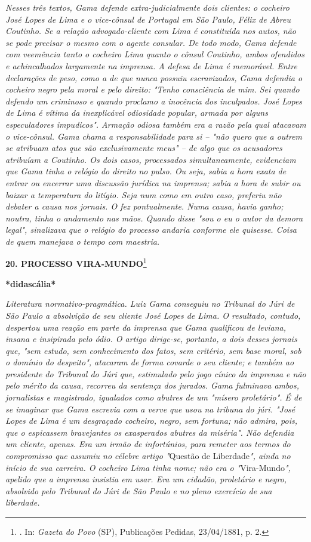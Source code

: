 \emph{Nesses três textos, Gama defende extra-judicialmente dois
clientes: o cocheiro José Lopes de Lima e o vice-cônsul de Portugal em
São Paulo, Félix de Abreu Coutinho. Se a relação advogado-cliente com
Lima é constituída nos autos, não se pode precisar o mesmo com o agente
consular. De todo modo, Gama defende com veemência tanto o cocheiro Lima
quanto o cônsul Coutinho, ambos ofendidos e achincalhados largamente na
imprensa. A defesa de Lima é memorável. Entre declarações de peso, como
a de que nunca possuiu escravizados, Gama defendia o cocheiro negro pela
moral e pelo direito: "Tenho consciência de mim. Sei quando defendo um
criminoso e quando proclamo a inocência dos inculpados. José Lopes de
Lima é vítima da inexplicável odiosidade popular, armada por alguns
especuladores impudicos". Armação odiosa também era a razão pela qual
atacavam o vice-cônsul. Gama chama a responsabilidade para si -- "não
quero que a outrem se atribuam atos que são exclusivamente meus" -- de
algo que os acusadores atribuíam a Coutinho. Os dois casos, processados
simultaneamente, evidenciam que Gama tinha o relógio do direito no
pulso. Ou seja, sabia a hora exata de entrar ou encerrar uma discussão
jurídica na imprensa; sabia a hora de subir ou baixar a temperatura do
litígio. Seja num como em outro caso, preferiu não debater a causa nos
jornais. O fez pontualmente. Numa causa, havia ganho; noutra, tinha o
andamento nas mãos. Quando disse "sou o eu o autor da demora legal",
sinalizava que o relógio do processo andaria conforme ele quisesse.
Coisa de quem manejava o tempo com maestria. }

\textbf{20. PROCESSO VIRA-MUNDO}\footnote{. In: \emph{Gazeta do Povo}
  (SP), Publicações Pedidas, 23/04/1881, p. 2.}

\textbf{*didascália*}

\emph{Literatura normativo-pragmática. Luiz Gama conseguiu no Tribunal
do Júri de São Paulo a absolvição de seu cliente José Lopes de Lima. O
resultado, contudo, despertou uma reação em parte da imprensa que Gama
qualificou de leviana, insana e insipirada pelo ódio. O artigo
dirige-se, portanto, a dois desses jornais que, "sem estudo, sem
conhecimento dos fatos, sem critério, sem base moral, sob o domínio do
despeito", atacaram de forma covarde o seu cliente; e também ao
presidente do Tribunal do Júri que, estimulado pelo jogo cínico da
imprensa e não pelo mérito da causa, recorreu da sentença dos jurados.
Gama fulminava ambos, jornalistas e magistrado, igualados como abutres
de um "mísero proletário". É de se imaginar que Gama escrevia com a
verve que usou na tribuna do júri. "José Lopes de Lima é um desgraçado
cocheiro, negro, sem fortuna; não admira, pois, que o espicassem
bravejantes os exasperados abutres da miséria". Não defendia um cliente,
apenas. Era um irmão de infortúnios, para remeter aos termos do
compromisso que assumiu no célebre artigo "}Questão de Liberdade\emph{",
ainda no início de sua carreira. O cocheiro Lima tinha nome; não era o
"}Vira-Mundo\emph{", apelido que a imprensa insistia em usar. Era um
cidadão, proletário e negro, absolvido pelo Tribunal do Júri de São
Paulo e no pleno exercício de sua liberdade. }

